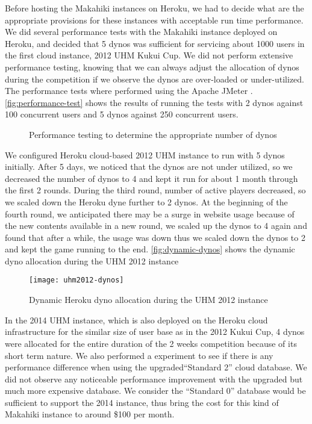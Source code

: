 Before hosting the Makahiki instances on Heroku, we had to decide what are the appropriate provisions for these instances with acceptable run time performance. 
We did several performance tests with the Makahiki instance deployed on Heroku, and decided that 5 dynos was sufficient for servicing about 1000 users in the first cloud instance, 2012 UHM Kukui Cup. We did not perform extensive performance testing, knowing that we can always adjust the allocation of dynos during the competition if we observe the dynos are over-loaded or under-utilized. The performance tests where performed using the Apache JMeter \cite{jmeter}. \autoref{fig:performance-test} shows the results of running the tests with 2 dynos against 100 concurrent users and 5 dynos against 250 concurrent users.

\begin{figure}[ht!]
	\centering
		\caption{Performance testing to determine the appropriate number of dynos}
		\label{fig:performance-test}
\end{figure}

We configured Heroku cloud-based 2012 UHM instance to run with 5 dynos initially. After 5 days, we noticed that the dynos are not under utilized, so we decreased the number of dynos to 4 and kept it run for about 1 month through the first 2 rounds. During the third round, number of active players decreased, so we scaled down the Heroku dyne further to 2 dynos. At the beginning of the fourth round, we anticipated there may be a surge in website usage because of the new contents available in a new round, we scaled up the dynos to 4 again and found that after a while, the usage was down thus we scaled down the dynos to 2 and kept the game running to the end. \autoref{fig:dynamic-dynos} shows the dynamic dyno allocation during the UHM 2012 instance

\begin{figure}[ht!]
  \center
  \texttt{[image: uhm2012-dynos]}
  \caption{Dynamic Heroku dyno allocation during the UHM 2012 instance}
  \label{fig:dynamic-dynos}
\end{figure}

In the 2014 UHM instance, which is also deployed on the Heroku cloud infrastructure for the similar size of user base as in the 2012 Kukui Cup, 4 dynos were allocated for the entire duration of the 2 weeks competition because of its short term nature. We also performed a experiment to see if there is any performance difference when using the upgraded``Standard 2'' cloud database. We did not observe any noticeable performance improvement with the upgraded but much more expensive database. We consider the ``Standard 0'' database would be sufficient to support the 2014 instance, thus bring the cost for this kind of Makahiki instance to around \$100 per month.

